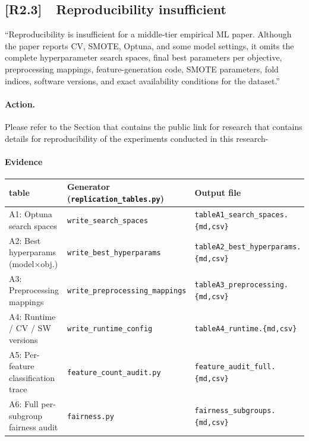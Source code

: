 \documentclass[11pt,a4paper]{article}
\newcommand{\cid}[1]{\textcolor{revred}{\textbf{[#1]}}}
\newcommand{\filebox}[1]{\texttt{\small #1}}
\begin{document}
\begin{itemize}
\subsection*{\cid{R2.3}~~Reproducibility insufficient}

\begin{reviewerquote}
``Reproducibility is insufficient for a middle-tier empirical ML paper. Although the paper reports CV, SMOTE, Optuna, and some model settings, it omits the complete hyperparameter search spaces, final best parameters per objective, preprocessing mappings, feature-generation code, SMOTE parameters, fold indices, software versions, and exact availability conditions for the dataset.''
\end{reviewerquote}

\paragraph{Action.} Please refer to the Section that contains the public link for research that contains details for reproducibility of the experiments conducted in this research-

\paragraph{Evidence }

\begin{center}\small
\begin{tabular}{l l l}
\toprule
\textbf{ table} & \textbf{Generator (\filebox{replication\_tables.py})} & \textbf{Output file} \\
\midrule
A1: Optuna search spaces        & \texttt{write\_search\_spaces}        & \filebox{tableA1\_search\_spaces.\{md,csv\}} \\
A2: Best hyperparams (model$\times$obj.) & \texttt{write\_best\_hyperparams}     & \filebox{tableA2\_best\_hyperparams.\{md,csv\}} \\
A3: Preprocessing mappings      & \texttt{write\_preprocessing\_mappings} & \filebox{tableA3\_preprocessing.\{md,csv\}} \\
A4: Runtime / CV / SW versions  & \texttt{write\_runtime\_config}       & \filebox{tableA4\_runtime.\{md,csv\}} \\
A5: Per-feature classification trace & \texttt{feature\_count\_audit.py} & \filebox{feature\_audit\_full.\{md,csv\}} \\
A6: Full per-subgroup fairness audit & \texttt{fairness.py}              & \filebox{fairness\_subgroups.\{md,csv\}} \\
\bottomrule
\end{tabular}
\end{center}


\end{itemize}
\end{document}
